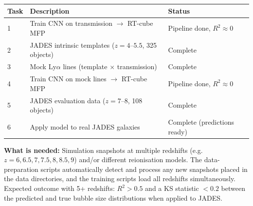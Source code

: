 \documentclass[11pt,a4paper]{article}
\begin{document}
\begin{center}
\begin{tabular}{lll}
\toprule
Task & Description & Status \\
\midrule
1 & Train CNN on transmission $\rightarrow$ RT-cube MFP & Pipeline done, $R^2 \approx 0$ \\
2 & JADES intrinsic templates ($z=4$--$5.5$, 325 objects) & Complete \\
3 & Mock Ly$\alpha$ lines (template $\times$ transmission) & Complete \\
4 & Train CNN on mock lines $\rightarrow$ RT-cube MFP & Pipeline done, $R^2 \approx 0$ \\
5 & JADES evaluation data ($z=7$--$8$, 108 objects) & Complete \\
6 & Apply model to real JADES galaxies & Complete (predictions ready) \\
\bottomrule
\end{tabular}
\end{center}

\textbf{What is needed:} Simulation snapshots at multiple redshifts
(e.g.\ $z = 6, 6.5, 7, 7.5, 8, 8.5, 9$) and/or different reionisation
models.
The data-preparation scripts automatically detect and process any new
snapshots placed in the data directories, and the training scripts load all
redshifts simultaneously.
Expected outcome with 5+ redshifts: $R^2 > 0.5$ and a KS statistic
$< 0.2$ between the predicted and true bubble size distributions when
applied to JADES.
\end{document}
